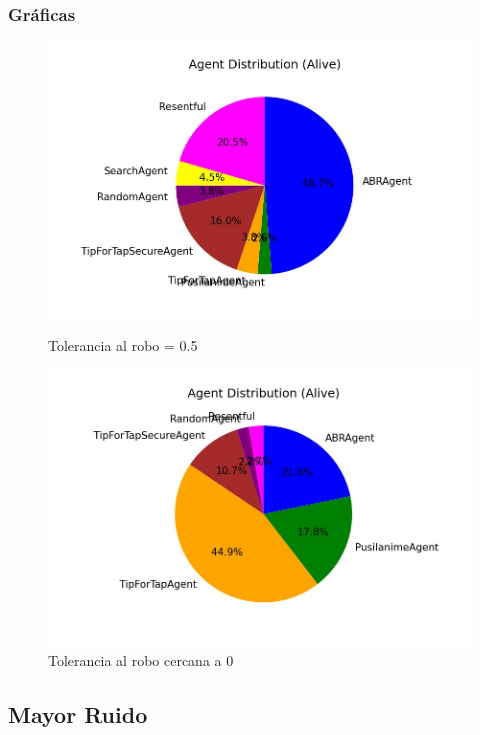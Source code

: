 \documentclass{article}
\begin{document}
\subsubsection{Gr\'aficas}
\begin{figure}[h]
      \centering
      \begin{minipage}{0.42\textwidth}
            \centering
            \includegraphics[width=\textwidth]{population_2.jpg}
            \caption{Tolerancia al robo = 0.5}
      \end{minipage}\hfill
      \begin{minipage}{0.42\textwidth}
            \centering
            \includegraphics[width=\textwidth]{population_3.jpg}
            \caption{Tolerancia al robo cercana a 0}
      \end{minipage}\hfill
\end{figure}


\subsection{Mayor Ruido}
\end{document}
